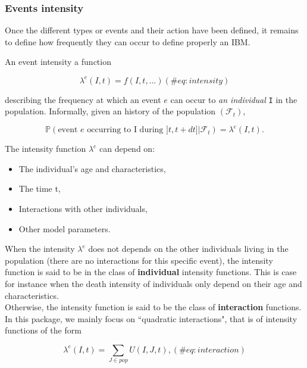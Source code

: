 \hypertarget{Eventintensityth}{%
\subsubsection{Events intensity}\label{Eventintensityth}}

Once the different types or events and their action have been defined, it remains to define how frequently they can occur to define properly an IBM.

An event intensity a function

\begin{equation}
\lambda^e(I,t) = f(I,t,\dots)
(\#eq:intensity)
\end{equation}

describing the frequency at which an event \(e\) can occur to \emph{an individual} \texttt{I} in the population. Informally, given an history of the population \((\mathcal{F}_t)\),

\begin{equation}
\mathbb{P}(\text{event } e \text{ occurring to I during } ]t,t+dt] | \mathcal{F}_t) = \lambda^e(I,t).
\end{equation}

The intensity function \(\lambda^e\) can depend on:

\begin{itemize}
\tightlist
\item
  The individual's age and characteristics,
\item
  The time t,
\item
  Interactions with other individuals,
\item
  Other model parameters.
\end{itemize}

When the intensity \(\lambda^e\) does not depends on the other individuals living in the population (there are no interactions for this specific event), the intensity function is said to be in the class of \textbf{individual} intensity functions. This is case for instance when the death intensity of individuals only depend on their age and characteristics.\\
Otherwise, the intensity function is said to be the class of \textbf{interaction} functions. In this package, we mainly focus on ``quadratic interactions", that is of intensity functions of the form

\begin{equation}
\lambda^e(I,t) = \sum_{J \in pop} U(I,J,t),
  (\#eq:interaction)
\end{equation}

